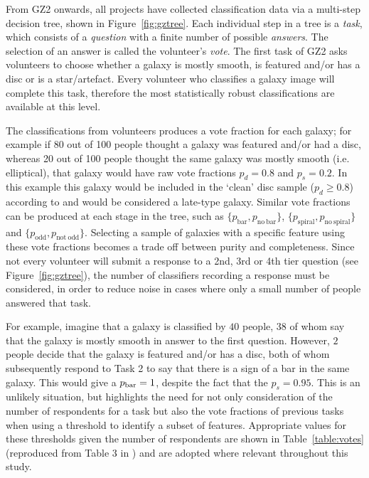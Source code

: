 From GZ2 onwards, all projects have collected classification data via a multi-step decision tree, shown in Figure~\ref{fig:gztree}.  Each individual step in a tree is a \emph{task}, which consists of a \emph{question} with a finite number of possible \emph{answers}. The selection of an answer is called the volunteer's \emph{vote}. The first task of GZ2 asks volunteers to choose whether a galaxy is mostly smooth, is featured and/or has a disc or is a star/artefact. Every volunteer who classifies a galaxy image will complete this task, therefore the most statistically robust classifications are available at this level.


The classifications from volunteers produces a vote fraction for each galaxy; for example if 80 out of 100 people thought a galaxy was featured and/or had a disc, whereas 20 out of 100 people thought the same galaxy was mostly smooth (i.e. elliptical), that galaxy would have raw vote fractions $p_{d} = 0.8$ and $p_{s} = 0.2$. In this example this galaxy would be included in the `clean' disc sample ($p_d \geq 0.8$) according to \cite{GZ2} and would be considered a late-type galaxy. Similar vote fractions can be produced at each stage in the tree, such as $\{p_{\mathrm{bar}}, p_{\mathrm{no~bar}}\}$, $\{p_{\mathrm{spiral}}, p_{\mathrm{no~spiral}}\}$ and $\{p_{\mathrm{odd}}, p_{\mathrm{not~odd}}\}$. Selecting a sample of galaxies with a specific feature using these vote fractions becomes a trade off between purity and completeness. Since not every volunteer will submit a response to a 2nd, 3rd or 4th tier question (see Figure~\ref{fig:gztree}), the number of classifiers recording a response must be considered, in order to reduce noise in cases where only a small number of people answered that task. 

For example, imagine that a galaxy is classified by $40$ people, $38$ of whom say that the galaxy is mostly smooth in answer to the first question. However, $2$ people decide that the galaxy is featured and/or has a disc, both of whom subsequently respond to Task 2 to say that there is a sign of a bar in the same galaxy. This would give a $p_{\rm{bar}}=1$, despite the fact that the $p_s = 0.95$. This is an unlikely situation, but highlights the need for not only consideration of the number of respondents for a task but also the vote fractions of previous tasks when using a threshold to identify a subset of features. Appropriate values for these thresholds given the number of respondents are shown in Table~\ref{table:votes} (reproduced from Table 3 in \citealt{GZ2}) and are adopted where relevant throughout this study. 

